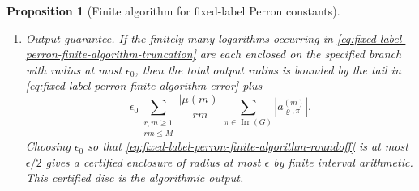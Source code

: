 \documentclass[11pt,a4paper]{amsart}
\theoremstyle{plain}
\newtheorem{proposition}[theorem]{Proposition}
\theoremstyle{definition}
\theoremstyle{remark}
\DeclareMathOperator{\Irr}{Irr}
\begin{document}
\begin{proposition}[Finite algorithm for fixed-label Perron constants]
\begin{enumerate}[label=\textup{(\alph*)},leftmargin=*]
\begin{equation}
        \sum_{k>M}\frac{\mathrm d(k)}{k}\lambda^{1-k}
        \le
        Q_\varrho\frac{\theta^{M+1}}{1-\theta},
      \end{equation}
      because \(\mathrm d(k)\le k\).  Thus the truncations converge absolutely
      and exponentially, and the same finite procedure gives certified
      interval enclosures by truncating after any prescribed rational tail
      bound.
    \item \emph{Output guarantee.}  If
      the finitely many logarithms occurring in
      \eqref{eq:fixed-label-perron-finite-algorithm-truncation} are each
      enclosed on the specified branch with radius at most \(\epsilon_0\), then
      the total output radius is bounded by the tail in
      \eqref{eq:fixed-label-perron-finite-algorithm-error} plus
      \begin{equation}\label{eq:fixed-label-perron-finite-algorithm-roundoff}
        \epsilon_0
        \sum_{\substack{r,m\ge1\\rm\le M}}
          \frac{|\mu(m)|}{rm}
          \sum_{\pi\in\Irr(G)}|a_{\varrho,\pi}^{(m)}| .
      \end{equation}
      Choosing \(\epsilon_0\) so that
      \eqref{eq:fixed-label-perron-finite-algorithm-roundoff} is at most
      \(\epsilon/2\) gives a certified enclosure of radius at most
      \(\epsilon\) by finite interval arithmetic.  This certified disc is the
      algorithmic output.
  \end{enumerate}
\end{proposition}
\end{document}
